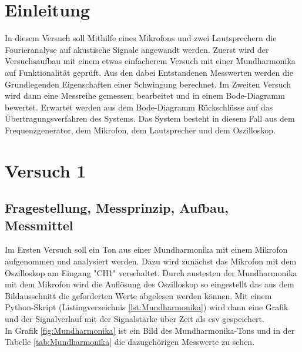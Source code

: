 \documentclass[12pt, oneside, a4paper, \docLanguage]{report}
\begin{document}




\clearpage

%
%


%
%


%
%


%
%




\setcounter{page}{1}
%
%
\chapter{Einleitung}
\label{chap:EINL}

In diesem Versuch soll Mithilfe eines Mikrofons und zwei Lautsprechern die Fourieranalyse auf akustische Signale angewandt werden. Zuerst wird der Versuchsaufbau mit einem etwas einfacherem Versuch mit einer Mundharmonika auf Funktionalität geprüft. Aus den dabei Entstandenen Messwerten werden die Grundlegenden Eigenschaften einer Schwingung berechnet. Im Zweiten Versuch wird dann eine Messreihe gemessen, bearbeitet und in einem Bode-Diagramm bewertet. Erwartet werden aus dem Bode-Diagramm Rückschlüsse auf das Übertragungsverfahren des Systems. Das System besteht in diesem Fall aus dem Frequenzgenerator, dem Mikrofon, dem Lautsprecher und dem Oszilloskop.

%
%
\chapter{Versuch 1}
\label{chap:VERSUCH_1}

\section{Fragestellung, Messprinzip, Aufbau, Messmittel}
\label{chap:VERSUCH_1_FRAGESTELLUNG}

Im Ersten Versuch soll ein Ton aus einer Mundharmonika mit einem Mikrofon aufgenommen und analysiert werden. Dazu wird zunächst das Mikrofon mit dem Oszilloskop am Eingang "CH1" verschaltet. Durch austesten der Mundharmonika mit dem Mikrofon wird die Auflösung des Oszilloskop so eingestellt das aus dem Bildausschnitt die geforderten Werte abgelesen werden können. Mit einem Python-Skript (Listingverzeichnis \ref{lst:Mundharmonika}) wird dann eine Grafik und der Signalverlauf mit der Signalstärke über Zeit als csv gespeichert. \\
In Grafik \ref{fig:Mundharmonika} ist ein Bild des Mundharmonika-Tons und in der Tabelle \ref{tab:Mundharmonika} die dazugehörigen Messwerte zu sehen.
\end{document}
